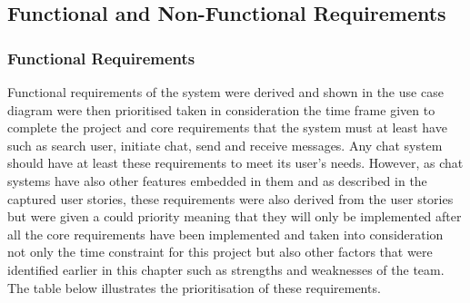 \documentclass{article}
\begin{document}
\subsection{Functional and Non-Functional Requirements}
\subsubsection{Functional Requirements}
Functional requirements of the system were derived and shown in the use case diagram were then prioritised taken in consideration the time frame given to complete the project and core requirements that the system must at least have such as search user, initiate chat, send and receive messages. Any chat system should have at least these requirements to meet its user’s needs. However, as chat systems have also other features embedded in them and as described in the captured user stories, these requirements were also derived from the user stories but were given a could priority meaning that they will only be implemented after all the core requirements have been implemented and taken into consideration not only the time constraint for this project but also other factors that were identified earlier in this chapter such as strengths and weaknesses of the team. The table below illustrates the prioritisation of these requirements. \par
\end{document}
